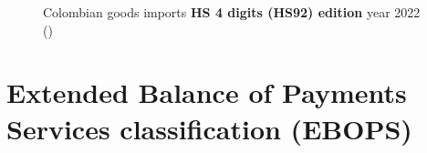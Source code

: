 \documentclass[
  ignorenonframetext,
]{beamer}
\begin{document}
\begin{frame}{}
\label{section-9}
\begin{figure}


\caption{\label{fig-colombian-goods-imports-2022}Colombian goods imports
\textbf{HS 4 digits (HS92) edition} year 2022
()}

\end{figure}%
\end{frame}

\section{Extended Balance of Payments Services classification
(EBOPS)}\label{extended-balance-of-payments-services-classification-ebops}
\end{document}
